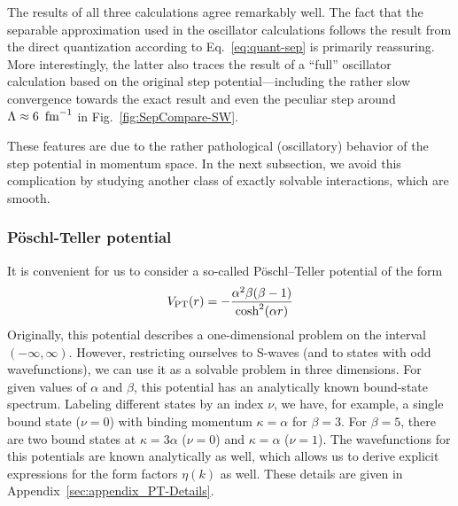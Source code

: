 	The results of all three calculations agree remarkably well.  The fact that
	the separable approximation used in the oscillator calculations follows the
	result from the direct quantization according to Eq.~\eqref{eq:quant-sep} is
	primarily reassuring.  More interestingly, the latter also traces the result
	of a ``full''
	oscillator calculation based on the original step potential---including the
	rather slow convergence towards the exact result and even the peculiar step
	around $\Lambda\approx6~\,\text{fm}^{-1}$ in Fig.~\ref{fig:SepCompare-SW}.

	These features are due to the rather pathological (oscillatory)
	behavior of the step potential in momentum space.  In the next subsection, we
	avoid this complication by studying another class of exactly solvable
	interactions, which are smooth.

	\medskip
	\subsubsection{P\"{o}schl-Teller potential}

	It is convenient for us to consider a
	so-called P\"{o}schl--Teller potential of the form
	\begin{equation}
	 V_{\text{PT}}(r) = -\frac{\alpha^2 \beta(\beta-1)}{\cosh^2(\alpha r)}
	\label{eq:V-PT}
	\end{equation}
	Originally, this potential describes a one-dimensional problem on the interval
	$(-\infty,\infty)$.  However, restricting ourselves to S-waves (and to
	states with odd wavefunctions), we can use it as a solvable problem in
	three dimensions.  For given values of $\alpha$ and $\beta$, this potential has
	an analytically known bound-state spectrum.  Labeling different states by an
	index $\nu$, we have, for example, a single bound state ($\nu=0$) with binding
	momentum $\kappa=\alpha$ for $\beta=3$.  For $\beta=5$, there are two bound
	states at $\kappa=3\alpha$ ($\nu=0$) and $\kappa=\alpha$ ($\nu=1$).  The
	wavefunctions for this potentials are known analytically as well, which allows
	us to derive explicit expressions for the form factors $\eta(k)$ as well.
	These details are given in Appendix~\ref{sec:appendix_PT-Details}.

